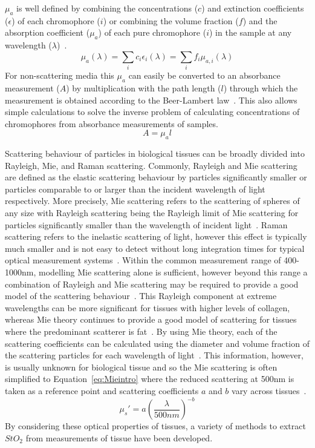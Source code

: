 $\mu_a$ is well defined by combining the concentrations ($c$) and extinction coefficients ($\epsilon$) of each chromophore ($i$) or combining the volume fraction ($f$) and the absorption coefficient ($\mu_a$) of each pure chromophore ($i$) in the sample at any wavelength ($\lambda$)~\citep{Jacques2013, MacKenzie2018}. 
\begin{equation}
    \mu_a(\lambda) = \sum_i c_i \epsilon_i(\lambda) = \sum_i f_i \mu_{a, i}(\lambda)
    \label{eq:definemua}
\end{equation}
For non-scattering media this $\mu_a$ can easily be converted to an absorbance measurement ($A$) by multiplication with the path length ($l$) through which the measurement is obtained according to the Beer-Lambert law~\citep{MacKenzie2018}. This also allows simple calculations to solve the inverse problem of calculating concentrations of chromophores from absorbance measurements of samples. 
\begin{equation}
    A = \mu_al
\end{equation}

Scattering behaviour of particles in biological tissues can be broadly divided into Rayleigh, Mie, and Raman scattering. Commonly, Rayleigh and Mie scattering are defined as the elastic scattering behaviour by particles significantly smaller or particles comparable to or larger than the incident wavelength of light respectively. More precisely, Mie scattering refers to the scattering of spheres of any size with Rayleigh scattering being the Rayleigh limit of Mie scattering for particles significantly smaller than the wavelength of incident light~\citep{Jacques2013}. Raman scattering refers to the inelastic scattering of light, however this effect is typically much smaller and is not easy to detect without long integration times for typical optical measurement systems~\citep{Kong2015}. Within the common measurement range of 400-1000nm, modelling Mie scattering alone is sufficient, however beyond this range a combination of Rayleigh and Mie scattering may be required to provide a good model of the scattering behaviour~\citep{Jacques2013}. This Rayleigh component at extreme wavelengths can be more significant for tissues with higher levels of collagen, whereas Mie theory continues to provide a good model of scattering for tissues where the predominant scatterer is fat~\citep{Jacques2013}. By using Mie theory, each of the scattering coefficients can be calculated using the diameter and volume fraction of the scattering particles for each wavelength of light~\citep{Hergert2012}. This information, however, is usually unknown for biological tissue and so the Mie scattering is often simplified to Equation~\eqref{eq:Mieintro} where the reduced scattering at 500nm is taken as a reference point and scattering coefficients $a$ and $b$ vary across tissues~\citep{Jacques2013}. 
\begin{equation}
    \mu_s' = a(\frac{\lambda}{500nm})^{-b}
    \label{eq:Mieintro}
\end{equation}
By considering these optical properties of tissues, a variety of methods to extract $StO_2$ from measurements of tissue have been developed. 

